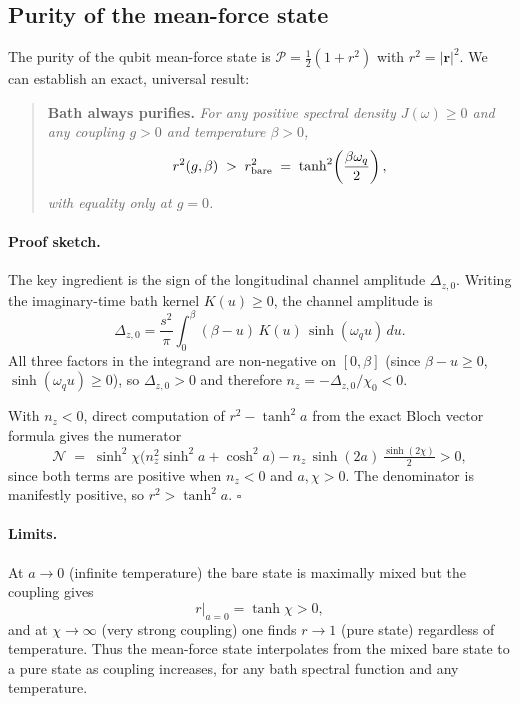 \subsection{Purity of the mean-force state}
\label{subsec:purity}

The purity of the qubit mean-force state is $\mathcal{P} = \tfrac{1}{2}(1 +
r^2)$ with $r^2 = |\mathbf{r}|^2$.  We can establish an exact, universal
result:
\begin{quote}
\textbf{Bath always purifies.} \textit{For any positive spectral density
$J(\omega)\geq 0$ and any coupling $g>0$ and temperature $\beta>0$,}
\begin{equation}
    r^2(g,\beta) \;>\; r_{\rm bare}^2 \;=\; \tanh^2\!\left(\frac{\beta\omega_q}{2}\right),
    \label{eq:purity_bound}
\end{equation}
\textit{with equality only at $g=0$.}
\end{quote}

\paragraph{Proof sketch.}
The key ingredient is the sign of the longitudinal channel amplitude $\Delta_{z,0}$.
Writing the imaginary-time bath kernel $K(u)\geq 0$, the channel amplitude is
\begin{equation}
    \Delta_{z,0} = \frac{s^2}{\pi}\int_0^\beta ({\beta}-u)\,K(u)\,\sinh(\omega_q u)\,du.
\end{equation}
All three factors in the integrand are non-negative on $[0,\beta]$
(since $\beta - u \geq 0$, $\sinh(\omega_q u) \geq 0$), so $\Delta_{z,0} > 0$
and therefore $n_z = -\Delta_{z,0}/\chi_0 < 0$.

With $n_z < 0$, direct computation of $r^2 - \tanh^2 a$ from the exact
Bloch vector formula gives the numerator
\begin{equation}
    \mathcal{N} \;=\; \sinh^2\!\chi\bigl(n_z^2\sinh^2\!a + \cosh^2\!a\bigr)
    - n_z\,\sinh(2a)\,\tfrac{\sinh(2\chi)}{2} > 0,
\end{equation}
since both terms are positive when $n_z < 0$ and $a,\chi > 0$.  The
denominator is manifestly positive, so $r^2 > \tanh^2 a$. $\square$

\paragraph{Limits.}
At $a\to 0$ (infinite temperature) the bare state is maximally mixed but the
coupling gives
\begin{equation}
    r\big|_{a=0} = \tanh\chi > 0,
    \label{eq:purity_highT}
\end{equation}
and at $\chi\to\infty$ (very strong coupling) one finds $r\to 1$ (pure state)
regardless of temperature.  Thus the mean-force state interpolates from the
mixed bare state to a pure state as coupling increases, for any bath spectral
function and any temperature.

